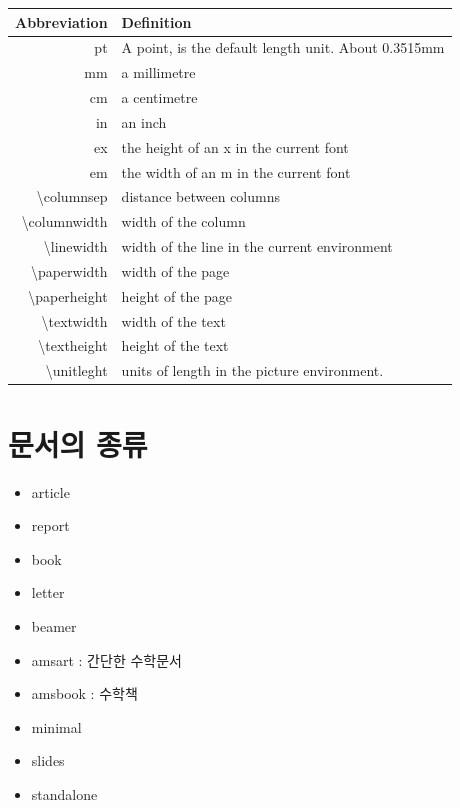 \documentclass[12pt, a4paper, oneside]{book}
\let\stdsection\section
\renewcommand\section{\newpage\stdsection}
\begin{document}
		\begin{table}[h!]
		\begin{tabularx}{1.0\textwidth}{ r X }
		\toprule
		Abbreviation				&Definition \\
		\midrule
		pt						&A point, is the default length unit. About 0.3515mm \\
		mm						&a millimetre \\
		cm 						&a centimetre \\
		in						&an inch \\
		ex						&the height of an x in the current font \\
		em						&the width of an m in the current font \\
		\textbackslash columnsep	&distance between columns \\
		\textbackslash columnwidth	&width of the column \\
		\textbackslash linewidth	&width of the line in the current environment \\
		\textbackslash paperwidth	&width of the page \\
		\textbackslash paperheight	&height of the page \\
		\textbackslash textwidth	&width of the text \\
		\textbackslash textheight	&height of the text \\
		\textbackslash unitleght	&units of length in the picture environment. \\
		\bottomrule
		\end{tabularx}
		\end{table}







\newpage
\section{문서의 종류}
\null

	\begin{itemize}
		\item 	article
		\item 	report
		\item 	book
		\item 	letter
		\item 	beamer
		\item 	amsart : 간단한 수학문서
		\item 	amsbook : 수학책
		\item 	minimal
		\item 	slides
		\item 	standalone
	\end{itemize}
\end{document}
